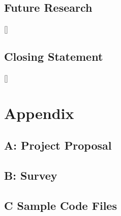 \documentclass{article}
\begin{document}
    \subsection{Future Research}
        []
    \subsection{Closing Statement}
        []

\newpage

\newpage
\section*{Appendix}
    \subsection*{A: Project Proposal}
        
    \subsection*{B: Survey}
    \label{apx:survey}
        
    \subsection*{C Sample Code Files}
    \label{apx:sampleCode}
\end{document}
